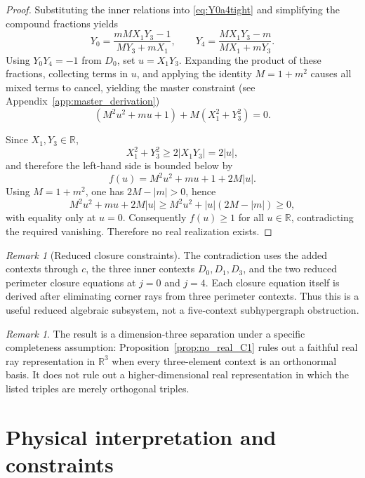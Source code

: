 \documentclass[
  twocolumn,
  aps,
  pra,
  floatfix,
  amsmath,amssymb,
  longbibliography
]{revtex4-2}
\theoremstyle{definition}
\theoremstyle{remark}
\newtheorem{remark}[theorem]{Remark}
\begin{document}
\begin{proof}
\medskip\noindent
Substituting the inner relations into \eqref{eq:Y0a4tight}  and simplifying the compound fractions yields
\[
  Y_0=\frac{m M X_1Y_3-1}{M Y_3+mX_1},\qquad
  Y_4=\frac{M X_1Y_3-m}{M X_1+mY_3}.
\]
Using \(Y_0Y_4=-1\) from \(D_0\), set \(u=X_1Y_3\). Expanding the product of these fractions, collecting terms in \(u\), and applying the identity \(M=1+m^2\) causes all mixed terms to cancel, yielding the master constraint (see Appendix~\ref{app:master_derivation})
\begin{equation}
\label{eq:master}
(M^2 u^2 + m u + 1) + M(X_1^2+Y_3^2)=0.
\end{equation}

Since \(X_1,Y_3\in\mathbb{R}\),
\[
  X_1^2+Y_3^2 \ge 2|X_1Y_3|=2|u|,
\]
and therefore the left-hand side is bounded below by
\[
  f(u)=M^2 u^2 + m u + 1 + 2M|u|.
\]
Using \(M=1+m^2\), one has \(2M-|m|>0\), hence
\[
  M^2 u^2 + m u + 2M|u| \ge M^2 u^2 + |u|(2M-|m|)\ge 0,
\]
with equality only at \(u=0\). Consequently \(f(u)\ge 1\) for all \(u\in\mathbb{R}\), contradicting the required vanishing. Therefore no real realization exists.
\end{proof}

\begin{remark}[Reduced closure constraints]
The contradiction uses the added contexts through $c$, the three inner
contexts $D_0,D_1,D_3$, and the two reduced perimeter closure equations
at $j=0$ and $j=4$.  Each closure equation itself is derived after
eliminating corner rays from three perimeter contexts.  Thus this is a
useful reduced algebraic subsystem, not a five-context subhypergraph
obstruction.
\end{remark}



\begin{remark}
The result is a dimension-three separation under a specific completeness
assumption: Proposition~\ref{prop:no_real_C1} rules out a faithful real
ray representation in \(\mathbb R^3\) when every three-element context
is an orthonormal basis.  It does not rule out a higher-dimensional real
representation in which the listed triples are merely orthogonal triples.
\end{remark}

\section{Physical interpretation and constraints}
\end{document}
